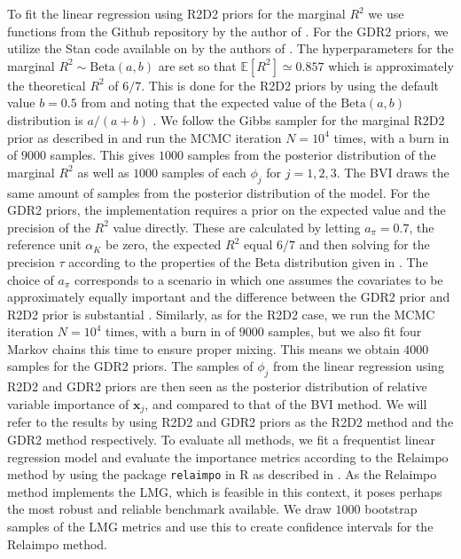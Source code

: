 \noindent To fit the linear regression using R2D2 priors for the marginal $R^2$ we use functions from the Github repository \citet{zhang2024r2d2_git} by the author of \citet{zhang2020bayesian}. For the GDR2 priors, we utilize the Stan code available on \citet{aguilar2024GDR_code} by the authors of \citet{aguilar2024generalized}. The hyperparameters for the marginal $R^2 \sim \text{Beta}(a, b)$ are set so that $\mathbb{E}[R^2] \simeq 0.857$ which is approximately the theoretical $R^2$ of $6/7$. This is done for the R2D2 priors by using the default value $b=0.5$ from \citet{zhang2024r2d2_git} and noting that the expected value of the $\text{Beta}(a, b)$ distribution is $a/(a+b)$ \citep{stats_book}. We follow the Gibbs sampler for the marginal R2D2 prior as described in \citep[section 5.3]{zhang2020bayesian} and run the MCMC iteration $N=10^4$ times, with a burn in of $9000$ samples. This gives $1000$ samples from the posterior distribution of the marginal $R^2$ as well as $1000$ samples of each $\phi_j$ for $j=1, 2, 3$. The BVI draws the same amount of samples from the posterior distribution of the model.
For the GDR2 priors, the implementation requires a prior on the expected value and the precision of the $R^2$ value directly. These are calculated by letting $a_{\pi}=0.7$, the reference unit $\alpha_K$ be zero, the expected $R^2$ equal $6/7$ and then solving for the precision $\tau$ according to the properties of the Beta distribution given in \citet{aguilar2024generalized}. The choice of $a_{\pi}$ corresponds to a scenario in which one assumes the covariates to be approximately equally important and the difference between the GDR2 prior and R2D2 prior is substantial \citep{aguilar2024generalized}. Similarly, as for the R2D2 case, we run the MCMC iteration $N=10^4$ times, with a burn in of $9000$ samples, but we also fit four Markov chains this time to ensure proper mixing. This means we obtain $4000$ samples for the GDR2 priors. The samples of $\phi_j$ from the linear regression using R2D2 and GDR2 priors are then seen as the posterior distribution of relative variable importance of $\mathbf{x}_j$, and compared to that of the BVI method. We will refer to the results by using R2D2 and GDR2 priors as the R2D2 method and the GDR2 method respectively. To evaluate all methods, we fit a frequentist linear regression model and evaluate the importance metrics according to the Relaimpo method by using the package \texttt{relaimpo} \citep{groemping2023relaimpo} in R as described in \citet{gromping_relaimpo}. As the Relaimpo method implements the LMG, which is feasible in this context, it poses perhaps the most robust and reliable benchmark available. We draw $1000$ bootstrap samples of the LMG metrics and use this to create confidence intervals for the Relaimpo method. 




